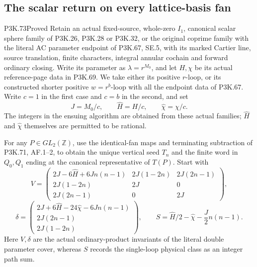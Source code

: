 \subsection{The scalar return on every lattice-basis fan}
\begin{statement}{P3K.73}{Proved}
Retain an actual fixed-source, whole-zero \(I_1\), canonical scalar
sphere family of P3K.26, P3K.28 or P3K.32, or the original coprime
family with the literal AC parameter endpoint of P3K.67, SE.5,
with its marked Cartier
line, source translation, finite characters, integral annular
cochain and forward ordinary closing. Write its parameter as
\(\lambda=r^{M_0}\), and let \(H,\chi\) be its actual reference-page
data in P3K.69. We take either its positive \(r\)-loop, or its
constructed shorter positive \(w=r^b\)-loop with all the endpoint
data of P3K.67. Write \(c=1\) in the first case and \(c=b\) in the
second, and set
\[
 J=M_0/c,\qquad \widehat H=H/c,\qquad
 \widehat\chi=\chi/c.
 \tag{P3K.73.1}
\]
The integers in the ensuing algorithm are obtained from these
actual families; \(\widehat H\) and \(\widehat\chi\) themselves
are permitted to be rational.

For any \(P\in GL_2(\mathbb Z)\), use the identical-fan maps and
terminating subtraction of P3K.71, AF.1--2, to obtain the unique
vertical seed \(T_n\) and the finite word in \(Q_0,Q_1\) ending
at the canonical representative of \(T(P)\). Start with
\[
 V=\begin{pmatrix}
 2J-6\widehat H+6Jn(n-1)&2J(1-2n)&2J(2n-1)\\
 2J(1-2n)&2J&0\\2J(2n-1)&0&2J
 \end{pmatrix},
\]
\[
 \delta=\begin{pmatrix}
 2J+6\widehat H-24\widehat\chi-6Jn(n-1)\\
 2J(2n-1)\\2J(1-2n)
 \end{pmatrix},\qquad
 S=\widehat H/2-\widehat\chi-\frac J2n(n-1).
 \tag{P3K.73.2}
\]
Here \(V,\delta\) are the actual ordinary-product invariants of
the literal double parameter cover, whereas \(S\) records the
single-loop physical class as an integer path sum.


\end{statement}
